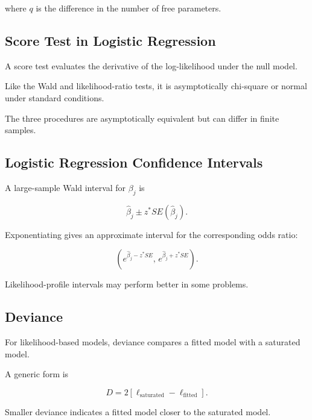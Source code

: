 where \(q\) is the difference in the number of free parameters.

\subsection{Score Test in Logistic Regression}
\label{subsec:score-test-logistic}

A score test evaluates the derivative of the log-likelihood under the
null model.

Like the Wald and likelihood-ratio tests, it is asymptotically
chi-square or normal under standard conditions.

The three procedures are asymptotically equivalent but can differ in
finite samples.

\subsection{Logistic Regression Confidence Intervals}
\label{subsec:logistic-confidence-intervals}

A large-sample Wald interval for \(\beta_j\) is

\[
\boxed{
\widehat{\beta}_j
\pm
z^*
SE(\widehat{\beta}_j).
}
\]

Exponentiating gives an approximate interval for the corresponding odds
ratio:

\[
\boxed{
\left(
e^{\widehat{\beta}_j-z^*SE},
\,
e^{\widehat{\beta}_j+z^*SE}
\right).
}
\]

Likelihood-profile intervals may perform better in some problems.

\subsection{Deviance}
\label{subsec:categorical-deviance}

For likelihood-based models, deviance compares a fitted model with a
saturated model.

A generic form is

\[
\boxed{
D
=
2
\left[
\ell_{\text{saturated}}
-
\ell_{\text{fitted}}
\right].
}
\]

Smaller deviance indicates a fitted model closer to the saturated model.


